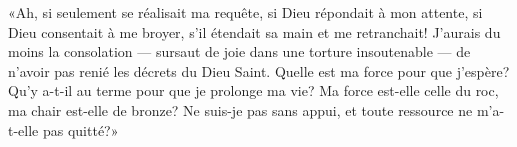 «Ah, si seulement se réalisait ma requête, si Dieu répondait à mon attente,
	si Dieu consentait à me broyer, s’il étendait sa main et me retranchait!
J’aurais du moins la consolation --- sursaut de joie dans une torture insoutenable ---
	de n’avoir pas renié les décrets du Dieu Saint.
Quelle est ma force pour que j’espère?
Qu’y a-t-il au terme pour que je prolonge ma vie?
Ma force est-elle celle du roc, ma chair est-elle de bronze?
Ne suis-je pas sans appui, et toute ressource ne m’a-t-elle pas quitté?»
